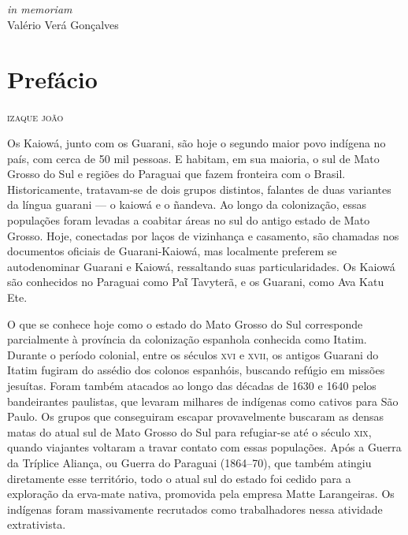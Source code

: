 \chapter*{}
\thispagestyle{empty}

\vfill
\begin{flushright}
\small
\textit{in memoriam}\\
Valério Verá Gonçalves
\end{flushright}

\chapter*{Prefácio}

\begin{flushright}
\textsc{izaque joão}
\end{flushright}

\noindent{}Os Kaiowá, junto com os Guarani, são hoje o segundo maior povo indígena
no país, com cerca de 50 mil pessoas. E habitam, em sua maioria, o sul
de Mato Grosso do Sul e regiões do Paraguai que fazem fronteira com o Brasil.
Historicamente, tratavam-se de dois grupos distintos, falantes de duas
variantes da língua guarani --- o kaiowá e o ñandeva. Ao longo da
colonização, essas populações foram levadas a coabitar áreas no
sul do antigo estado de Mato Grosso. Hoje, conectadas por laços de
vizinhança e casamento, são chamadas nos documentos oficiais de
Guarani-Kaiowá, mas localmente preferem se autodenominar Guarani e
Kaiowá, ressaltando suas particularidades. Os Kaiowá são conhecidos no
Paraguai como Paῖ Tavyterã, e os Guarani, como Ava Katu Ete.

O que se conhece hoje como o estado do Mato Grosso do Sul corresponde
parcialmente à província da colonização espanhola conhecida como Itatim.
Durante o período colonial, entre os séculos \textsc{xvi} e \textsc{xvii}, os antigos
Guarani do Itatim fugiram do assédio dos colonos espanhóis, buscando
refúgio em missões jesuítas. Foram também atacados ao longo das décadas
de 1630 e 1640 pelos bandeirantes paulistas, que levaram milhares de indígenas como cativos para São Paulo. Os grupos que conseguiram escapar
provavelmente buscaram as densas matas do atual sul de Mato Grosso do
Sul para refugiar-se até o século \textsc{xix}, quando viajantes voltaram a
travar contato com essas populações. Após a Guerra da Tríplice Aliança,
ou Guerra do Paraguai (1864--70), que também atingiu diretamente esse
território, todo o atual sul do estado foi cedido para a exploração da
erva-mate nativa, promovida pela empresa Matte Larangeiras. Os indígenas
foram massivamente recrutados como trabalhadores nessa atividade
extrativista.

